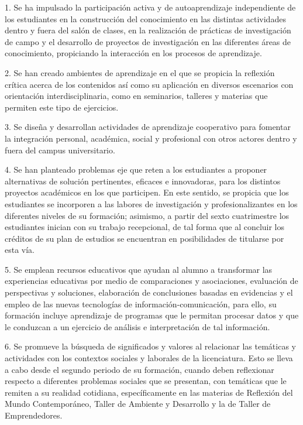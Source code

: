 \begin{Obs}
\item[1.] Se ha impulsado la participación activa y de autoaprendizaje independiente de los estudiantes en la construcción del conocimiento en las distintas actividades dentro y fuera del salón de clases, en la realización de prácticas de investigación de campo y el desarrollo de proyectos de investigación en las diferentes áreas de conocimiento, propiciando  la interacción  en los procesos de aprendizaje.
\item[2.] Se han creado ambientes de aprendizaje en el que se propicia la reflexión crítica acerca de los contenidos así como su aplicación en diversos escenarios con orientación interdisciplinaria, como  en  seminarios, talleres y materias que permiten este tipo de ejercicios.
\item[3.] Se diseña y desarrollan  actividades de aprendizaje cooperativo para fomentar la integración personal, académica, social y profesional con otros actores dentro y fuera del campus universitario.
\item[4.] Se  han planteado problemas eje  que reten a los estudiantes a proponer alternativas  de solución pertinentes, eficaces e innovadoras, para los distintos proyectos académicos en los que participen. En este sentido, se propicia que los estudiantes se incorporen a las labores de investigación y profesionalizantes en los diferentes niveles de su formación; asimismo, a partir del sexto cuatrimestre los estudiantes inician con su trabajo recepcional, de tal forma que al concluir los créditos de su plan de estudios se encuentran en  posibilidades de titularse por esta vía.
\item[5.] Se emplean  recursos educativos que ayudan al alumno a transformar las experiencias educativas por medio de comparaciones y asociaciones, evaluación de perspectivas y soluciones, elaboración de conclusiones basadas en evidencias y el empleo de las nuevas tecnologías de información-comunicación, para ello, su formación incluye aprendizaje de programas que le  permitan procesar datos  y que le conduzcan a un ejercicio de análisis e interpretación de tal información.
\item[6.] Se promueve la búsqueda de significados y valores al relacionar las temáticas y actividades con los contextos sociales y laborales de la licenciatura. Esto se lleva a cabo desde el segundo periodo de su formación, cuando deben reflexionar respecto a diferentes problemas sociales que se presentan, con temáticas que le  remiten a su realidad cotidiana, específicamente en las materias de Reflexión del Mundo Contemporáneo, Taller de Ambiente y Desarrollo y la de Taller de  Emprendedores.

\end{Obs}
